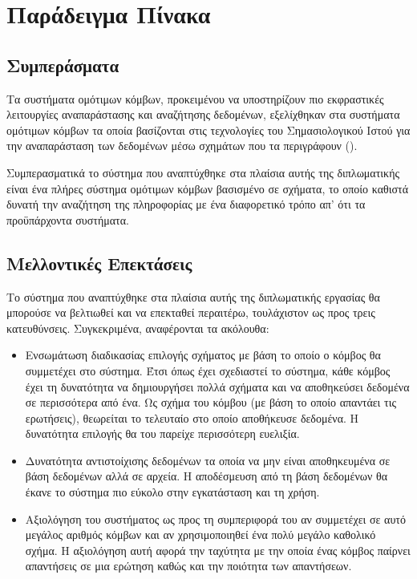 \chapter{Παράδειγμα Πίνακα}

\section{Συμπεράσματα}
Τα συστήματα ομότιμων κόμβων, προκειμένου να υποστηρίζουν πιο
εκφραστικές λειτουργίες αναπαράστασης και αναζήτησης δεδομένων,
εξελίχθηκαν στα συστήματα ομότιμων κόμβων τα οποία βασίζονται στις
τεχνολογίες του Σημασιολογικού Ιστού για την αναπαράσταση των
δεδομένων μέσω σχημάτων που τα περιγράφουν ().

Συμπερασματικά το σύστημα που αναπτύχθηκε στα πλαίσια αυτής της
διπλωματικής είναι ένα πλήρες σύστημα ομότιμων κόμβων βασισμένο σε
σχήματα, το οποίο καθιστά δυνατή την αναζήτηση της πληροφορίας με
ένα διαφορετικό τρόπο απ' ότι τα προϋπάρχοντα  συστήματα.

\section{Μελλοντικές Επεκτάσεις}
Το σύστημα που αναπτύχθηκε στα πλαίσια αυτής της διπλωματικής
εργασίας θα μπορούσε να βελτιωθεί και να επεκταθεί περαιτέρω,
τουλάχιστον ως προς τρεις κατευθύνσεις. Συγκεκριμένα, αναφέρονται
τα ακόλουθα:

\begin{itemize}
\item Ενσωμάτωση διαδικασίας επιλογής σχήματος με βάση το οποίο ο
κόμβος θα συμμετέχει στο σύστημα. Έτσι όπως έχει σχεδιαστεί το
σύστημα, κάθε κόμβος έχει τη δυνατότητα να δημιουργήσει πολλά
σχήματα και να αποθηκεύσει δεδομένα σε περισσότερα από ένα. Ως
σχήμα του κόμβου (με βάση το οποίο απαντάει τις ερωτήσεις),
θεωρείται το τελευταίο στο οποίο αποθήκευσε δεδομένα. Η δυνατότητα
επιλογής θα του παρείχε περισσότερη ευελιξία.
\item Δυνατότητα αντιστοίχισης δεδομένων τα οποία να μην είναι
αποθηκευμένα σε βάση δεδομένων αλλά σε αρχεία. Η αποδέσμευση από
τη βάση δεδομένων θα έκανε το σύστημα πιο εύκολο στην εγκατάσταση
και τη χρήση.
\item Αξιολόγηση του συστήματος ως προς τη συμπεριφορά του αν
συμμετέχει σε αυτό μεγάλος αριθμός κόμβων  και αν χρησιμοποιηθεί ένα πολύ μεγάλο καθολικό σχήμα. H
αξιολόγηση αυτή αφορά την ταχύτητα με την οποία ένας κόμβος
παίρνει απαντήσεις σε μια ερώτηση καθώς και την ποιότητα των
απαντήσεων.
\end{itemize}

